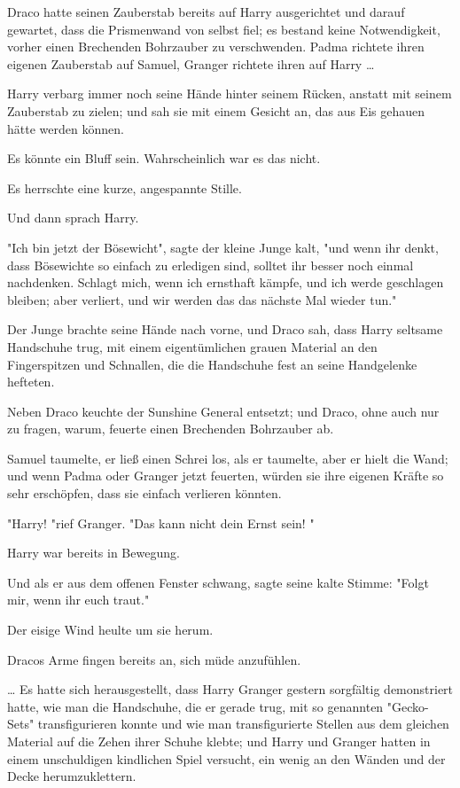 {Draco hatte seinen Zauberstab bereits auf Harry ausgerichtet und darauf gewartet, dass die Prismenwand von selbst fiel; es bestand keine Notwendigkeit, vorher einen Brechenden Bohrzauber zu verschwenden. Padma richtete ihren eigenen Zauberstab auf Samuel, Granger richtete ihren auf Harry …

Harry verbarg immer noch seine Hände hinter seinem Rücken, anstatt mit seinem Zauberstab zu zielen; und sah sie mit einem Gesicht an, das aus Eis gehauen hätte werden können.

Es könnte ein Bluff sein. Wahrscheinlich war es das nicht.

Es herrschte eine kurze, angespannte Stille.

Und dann sprach Harry.

"Ich bin jetzt der Bösewicht", sagte der kleine Junge kalt, "und wenn ihr denkt, dass Bösewichte so einfach zu erledigen sind, solltet ihr besser noch einmal nachdenken. Schlagt mich, wenn ich ernsthaft kämpfe, und ich werde geschlagen bleiben; aber verliert, und wir werden das das nächste Mal wieder tun."

Der Junge brachte seine Hände nach vorne, und Draco sah, dass Harry seltsame Handschuhe trug, mit einem eigentümlichen grauen Material an den Fingerspitzen und Schnallen, die die Handschuhe fest an seine Handgelenke hefteten.

Neben Draco keuchte der Sunshine General entsetzt; und Draco, ohne auch nur zu fragen, warum, feuerte einen Brechenden Bohrzauber ab.

Samuel taumelte, er ließ einen Schrei los, als er taumelte, aber er hielt die Wand; und wenn Padma oder Granger jetzt feuerten, würden sie ihre eigenen Kräfte so sehr erschöpfen, dass sie einfach verlieren könnten.

"Harry! "rief Granger. "Das kann nicht dein Ernst sein! "

Harry war bereits in Bewegung.

Und als er aus dem offenen Fenster schwang, sagte seine kalte Stimme: "Folgt mir, wenn ihr euch traut."

Der eisige Wind heulte um sie herum.

Dracos Arme fingen bereits an, sich müde anzufühlen.

… Es hatte sich herausgestellt, dass Harry Granger gestern sorgfältig demonstriert hatte, wie man die Handschuhe, die er gerade trug, mit so genannten "Gecko-Sets" transfigurieren konnte und wie man transfigurierte Stellen aus dem gleichen Material auf die Zehen ihrer Schuhe klebte; und Harry und Granger hatten in einem unschuldigen kindlichen Spiel versucht, ein wenig an den Wänden und der Decke herumzuklettern.

}
